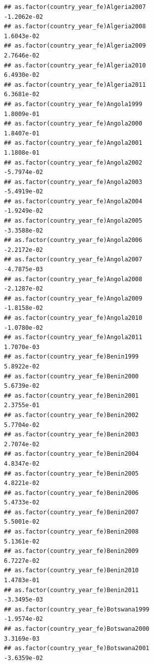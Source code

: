 \documentclass[
  a4paper,
]{article}
\begin{document}
\begin{verbatim}
## as.factor(country_year_fe)Algeria2007                          -1.2062e-02
## as.factor(country_year_fe)Algeria2008                           1.6043e-02
## as.factor(country_year_fe)Algeria2009                           2.7646e-02
## as.factor(country_year_fe)Algeria2010                           6.4930e-02
## as.factor(country_year_fe)Algeria2011                           6.3681e-02
## as.factor(country_year_fe)Angola1999                            1.8009e-01
## as.factor(country_year_fe)Angola2000                            1.8407e-01
## as.factor(country_year_fe)Angola2001                            1.1808e-01
## as.factor(country_year_fe)Angola2002                           -5.7974e-02
## as.factor(country_year_fe)Angola2003                           -5.4919e-02
## as.factor(country_year_fe)Angola2004                           -1.9249e-02
## as.factor(country_year_fe)Angola2005                           -3.3588e-02
## as.factor(country_year_fe)Angola2006                           -2.2172e-02
## as.factor(country_year_fe)Angola2007                           -4.7875e-03
## as.factor(country_year_fe)Angola2008                           -2.1287e-02
## as.factor(country_year_fe)Angola2009                           -1.8158e-02
## as.factor(country_year_fe)Angola2010                           -1.0780e-02
## as.factor(country_year_fe)Angola2011                            1.7070e-03
## as.factor(country_year_fe)Benin1999                             5.8922e-02
## as.factor(country_year_fe)Benin2000                             5.6739e-02
## as.factor(country_year_fe)Benin2001                             2.3755e-01
## as.factor(country_year_fe)Benin2002                             5.7704e-02
## as.factor(country_year_fe)Benin2003                             2.7074e-02
## as.factor(country_year_fe)Benin2004                             4.8347e-02
## as.factor(country_year_fe)Benin2005                             4.8221e-02
## as.factor(country_year_fe)Benin2006                             5.4733e-02
## as.factor(country_year_fe)Benin2007                             5.5001e-02
## as.factor(country_year_fe)Benin2008                             5.1361e-02
## as.factor(country_year_fe)Benin2009                             6.7227e-02
## as.factor(country_year_fe)Benin2010                             1.4783e-01
## as.factor(country_year_fe)Benin2011                            -3.3495e-03
## as.factor(country_year_fe)Botswana1999                         -1.9574e-02
## as.factor(country_year_fe)Botswana2000                          3.3169e-03
## as.factor(country_year_fe)Botswana2001                         -3.6359e-02

\end{verbatim}
\end{document}

